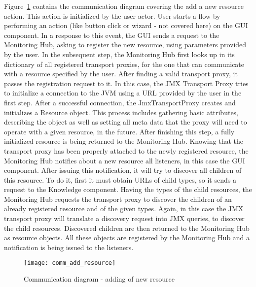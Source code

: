 Figure~\ref{fig:comm_add_resource} contains the communication diagram covering the add a new resource action. This action is initialized by the user actor. User starts a flow by performing an action (like button click or wizard - not covered here) on the GUI component. In a response to this event, the GUI sends a request to the Monitoring Hub, asking to register the new resource, using parameters provided by the user. In the subsequent step, the Monitoring Hub first looks up in its dictionary of all registered transport proxies, for the one that can communicate with a resource specified by the user. After finding a valid transport proxy, it passes the registration request to it. In this case, the JMX Transport Proxy tries to initialize a connection to the JVM using a URL provided by the user in the first step. After a successful connection, the JmxTransportProxy creates and initializes a Resource object. This process includes gathering basic attributes, describing the object as well as setting all meta data that the proxy will need to operate with a given resource, in the future. After finishing this step, a fully initialized resource is being returned to the Monitoring Hub. Knowing that the transport proxy has been properly attached to the newly registered resource, the Monitoring Hub notifies about a new resource all listeners, in this case the GUI component. After issuing this notification, it will try to discover all children of this resource. To do it, first it must obtain URLs of child types, so it sends a request to the Knowledge component. Having the types of the child resources, the Monitoring Hub requests the transport proxy to discover the children of an already registered resource and of the given types. Again, in this case the JMX transport proxy will translate a discovery request into JMX queries, to discover the child resources. Discovered children are then returned to the Monitoring Hub as resource objects. All these objects are registered by the Monitoring Hub and a notification is being issued to the listeners.

\begin{figure}[ht]
\centering
\texttt{[image: comm\_add\_resource]}
\caption{Communication diagram - adding of new resource}
\label{fig:comm_add_resource}
\end{figure}


